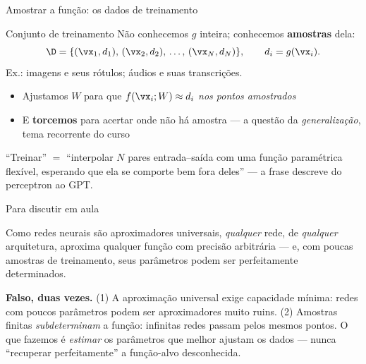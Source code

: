 \documentclass[aspectratio=169, 11pt]{beamer}
\begin{document}
\begin{frame}{Amostrar a função: os dados de treinamento}
  \begin{defbox}{Conjunto de treinamento}
    Não conhecemos $g$ inteira; conhecemos \textbf{amostras} dela:
    \[
      \D = \{(\vx_1, d_1),\, (\vx_2, d_2),\, \ldots,\, (\vx_N, d_N)\},
      \qquad d_i = g(\vx_i).
    \]
    Ex.: imagens e seus rótulos; áudios e suas transcrições.
  \end{defbox}

  \begin{itemize}\setlength{\itemsep}{0.3ex}
    \item Ajustamos $W$ para que $f(\vx_i; W) \approx d_i$ \emph{nos pontos
          amostrados}
    \item E \textbf{torcemos} para acertar onde não há amostra —
          a questão da \emph{generalização}, tema recorrente do curso
  \end{itemize}

  \begin{ideiabox}
    ``Treinar'' $=$ ``interpolar $N$ pares entrada--saída com uma função
    paramétrica flexível, esperando que ela se comporte bem fora deles'' —
    a frase descreve do perceptron ao GPT.
  \end{ideiabox}
\end{frame}

\begin{frame}{Para discutir em aula}
  \begin{quizbox}
    Como redes neurais são aproximadores universais, \emph{qualquer} rede, de
    \emph{qualquer} arquitetura, aproxima qualquer função com precisão
    arbitrária — e, com poucas amostras de treinamento, seus parâmetros podem
    ser perfeitamente determinados.

    \smallskip
  \end{quizbox}

  \pause

  \begin{respbox}
    \textbf{Falso, duas vezes.} (1) A aproximação universal exige
    \alert{capacidade mínima}: redes com poucos parâmetros podem ser
    aproximadores muito ruins. (2) Amostras finitas \emph{subdeterminam} a
    função: infinitas redes passam pelos mesmos pontos. O que fazemos é
    \emph{estimar} os parâmetros que melhor ajustam os dados — nunca
    ``recuperar perfeitamente'' a função-alvo desconhecida.
  \end{respbox}
\end{frame}
\end{document}
